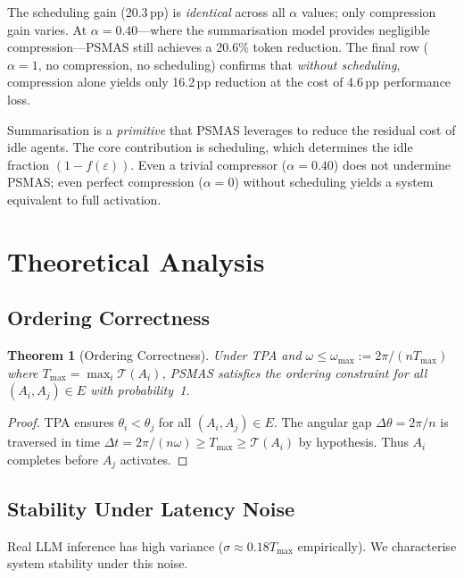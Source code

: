 \documentclass[10pt,twocolumn]{article}
\theoremstyle{plain}
\newtheorem{theorem}{Theorem}[section]
\theoremstyle{definition}
\theoremstyle{remark}
\newcommand{\T}{\mathcal{T}}
\newcommand{\eps}{\varepsilon}
\newcommand{\phase}{\theta}
\newcommand{\sweepvel}{\omega}
\begin{document}
The scheduling gain (20.3\,pp) is \emph{identical} across all $\alpha$
values; only compression gain varies.  At $\alpha=0.40$---where the
summarisation model provides negligible compression---PSMAS still
achieves a 20.6\% token reduction.  The final row ($\alpha=1$,
no compression, no scheduling) confirms that \emph{without scheduling},
compression alone yields only 16.2\,pp reduction at the cost of 4.6\,pp
performance loss.

\begin{tcolorbox}[insight={Takeaway on Compression}]
Summarisation is a \emph{primitive} that PSMAS leverages to reduce
the residual cost of idle agents.  The core contribution is scheduling,
which determines the idle fraction $(1-f(\eps))$.
Even a trivial compressor ($\alpha=0.40$) does not undermine PSMAS;
even perfect compression ($\alpha=0$) without scheduling yields a
system equivalent to full activation.
\end{tcolorbox}

\section{Theoretical Analysis}
\label{sec:theory}

\subsection{Ordering Correctness}

\begin{theorem}[Ordering Correctness]
\label{thm:ordering}
Under TPA and $\sweepvel\leq\sweepvel_{\max}:=2\pi/(nT_{\max})$
where $T_{\max}=\max_i\T(A_i)$, PSMAS satisfies the ordering
constraint for all $(A_i,A_j)\in E$ with probability~1.
\end{theorem}
\begin{proof}
TPA ensures $\phase_i<\phase_j$ for all $(A_i,A_j)\in E$.
The angular gap $\Delta\phase=2\pi/n$ is traversed in time
$\Delta t=2\pi/(n\sweepvel)\geq T_{\max}\geq\T(A_i)$ by hypothesis.
Thus $A_i$ completes before $A_j$ activates.
\end{proof}

\subsection{Stability Under Latency Noise}

Real LLM inference has high variance ($\sigma\approx0.18 T_{\max}$
empirically).  We characterise system stability under this noise.
\end{document}
